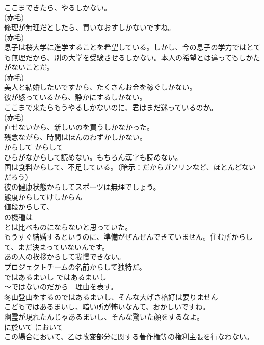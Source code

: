 \documentclass[8pt]{extreport}
\begin{document}
\begin{CJK}{UTF8}{min}
\\	ここまできたら、やるしかない。  
\\	(赤毛)
\\	修理が無理だとしたら、買いなおすしかないですね。  
\\	(赤毛)
\\	息子は桜大学に進学することを希望している。しかし、今の息子の学力ではとても無理だから、別の大学を受験させるしかない。本人の希望とは違ってもしかたがないことだ。  
\\	(赤毛)
\\	美人と結婚したいですから、たくさんお金を稼ぐしかない。  
\\	彼が怒っているから、静かにするしかない。  
\\	ここまで来たらもうやるしかないのに、君はまだ迷っているのか。  
\\	(赤毛)
\\	直せないから、新しいのを買うしかなかった。  
\\	残念ながら、時間はほんのわずかしかない。   
\\	からして	からして	
\\	ひらがなからして読めない。もちろん漢字も読めない。  
\\	国は食料からして、不足している。（暗示：だからガソリンなど、ほとんどないだろう）  
\\	彼の健康状態からしてスポーツは無理でしょう。  
\\	態度からしてけしからん  
\\	値段からして、
\\	の機種は
\\	とは比べものにならないと思っていた。  
\\	もうすぐ結婚するというのに、準備がぜんぜんできていません。住む所からして、まだ決まっていないんです。  
\\	あの人の挨拶からして我慢できない。   
\\	プロジェクトチームの名前からして独特だ。   
\\	ではあるまいし	ではあるまいし	
\\	〜ではないのだから　理由を表す。
\\	冬山登山をするのではあるまいし、そんな大げさ格好は要りません  
\\	こどもではあるまいし、暗い所が怖いなんて、おかしいですね。  
\\	幽霊が現れたんじゃあるまいし、そんな驚いた顔をするなよ。  
\\	に於いて	において	
\\	この場合において、乙は改変部分に関する著作権等の権利主張を行なわない。   

\end{CJK}
\end{document}
